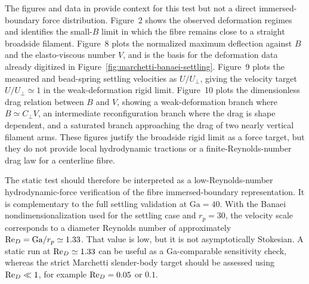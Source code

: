 The figures and data in \textcite{marchetti_deformation_2018} provide context
for this test but not a direct immersed-boundary force distribution. Figure~2
shows the observed deformation regimes and identifies the small-\(B\) limit in
which the fibre remains close to a straight broadside filament. Figure~8 plots
the normalized maximum deflection against \(B\) and the elasto-viscous number
\(V\), and is the basis for the deformation data already digitized in
Figure~\ref{fig:marchetti-banaei-settling}. Figure~9 plots the measured and
bead-spring settling velocities as \(U/U_{\perp}\), giving the velocity target
\(U/U_{\perp}\simeq 1\) in the weak-deformation rigid limit. Figure~10 plots
the dimensionless drag relation between \(B\) and \(V\), showing a
weak-deformation branch where \(B\simeq C_{\perp}V\), an intermediate
reconfiguration branch where the drag is shape dependent, and a saturated
branch approaching the drag of two nearly vertical filament arms. These figures
justify the broadside rigid limit as a force target, but they do not provide
local hydrodynamic tractions or a finite-Reynolds-number drag law for a
centerline fibre.

The static test should therefore be interpreted as a low-Reynolds-number
hydrodynamic-force verification of the fibre immersed-boundary representation.
It is complementary to the full settling validation at
\(\mathrm{Ga}=40\). With the Banaei nondimensionalization used for the settling
case and \(r_p=30\), the velocity scale corresponds to a diameter Reynolds
number of approximately \({\text {Re}}_D=\mathrm{Ga}/r_p\simeq 1.33\). That value
is low, but it is not asymptotically Stokesian. A static run at
\({\text {Re}}_D\simeq 1.33\) can be useful as a Ga-comparable sensitivity check,
whereas the strict Marchetti slender-body target should be assessed using
\({\text {Re}}_D\ll1\), for example \({\text {Re}}_D=0.05\) or \(0.1\).
